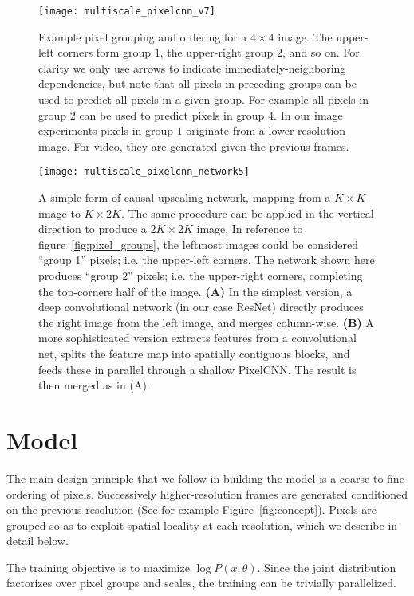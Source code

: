 \documentclass{article}
\begin{document}
\begin{figure*}[t!]
\centering
\texttt{[image: multiscale\_pixelcnn\_v7]}
\vspace{-0.1in}
\caption{Example pixel grouping and ordering for a $4 \times 4$ image. The upper-left corners form group $1$, the upper-right group $2$, and so on. For clarity we only use arrows to indicate immediately-neighboring dependencies, but note that all pixels in preceding groups can be used to predict all pixels in a given group. For example all pixels in group  $2$ can be used to predict pixels in group $4$. In our image experiments pixels in group $1$ originate from a lower-resolution image. For video, they are generated given the previous frames.\label{fig:pixel_groups}}
\vspace{0.15in}
\texttt{[image: multiscale\_pixelcnn\_network5]}
\vspace{-0.2in}
\caption{A simple form of causal upscaling network, mapping from a $K \times K$ image to $K \times 2K$. The same procedure can be applied in the vertical direction to produce a $2K \times 2K$ image. In reference to figure~\ref{fig:pixel_groups}, the leftmost images could be considered ``group 1'' pixels; i.e. the upper-left corners. The network shown here produces ``group 2'' pixels; i.e. the upper-right corners, completing the top-corners half of the image. \textbf{(A)} In the simplest version, a deep convolutional network (in our case ResNet) directly produces the right image from the left image, and merges column-wise. \textbf{(B)} A more sophisticated version extracts features from a convolutional net, splits the feature map into spatially contiguous blocks, and feeds these in parallel through a shallow PixelCNN. The result is then merged as in (A).\label{fig:upscaling_network}}
\vspace{-0.1in}
\end{figure*}
\section{Model}
\label{sec:model}


The main design principle that we follow in building the model is a coarse-to-fine ordering of pixels.
Successively higher-resolution frames are generated conditioned on the previous resolution (See for example Figure~\ref{fig:concept}).
Pixels are grouped so as to exploit spatial locality at each resolution, which we describe in detail below.


The training objective is to maximize $\log P(x; \theta)$.
Since the joint distribution factorizes over pixel groups and scales, the training can be trivially parallelized.
\end{document}

